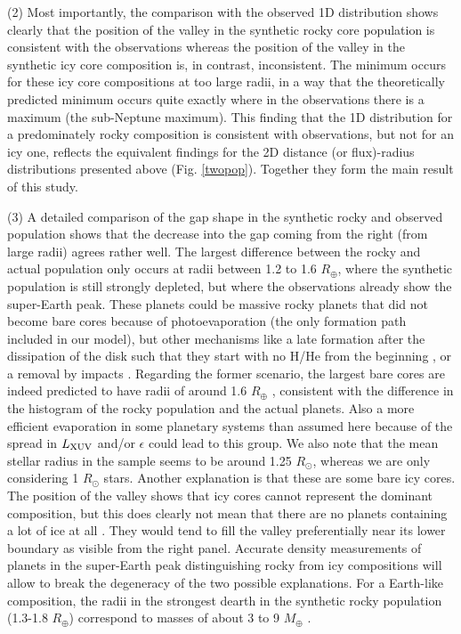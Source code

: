 \documentclass[]{emulateapj}
\def\mearth{M_{\oplus}}
\def\rearth{R_{\oplus}}
\begin{document}
(2)  Most importantly, the comparison with the observed 1D distribution shows clearly that the position of the valley  in the synthetic rocky core population is consistent with the \citet{Fulton2017} observations whereas the position of the valley in the synthetic icy core composition is, in contrast, inconsistent. The minimum occurs for these icy core compositions at too large radii, in a way that the theoretically predicted minimum occurs quite exactly where in the observations there is a maximum (the sub-Neptune maximum).  This finding that the 1D distribution for a predominately rocky composition is consistent with observations, but not for an icy  one, reflects the equivalent findings for the 2D distance (or flux)-radius distributions presented above (Fig. \ref{twopop}). Together they form the main result of this study.

(3) A detailed comparison of the gap shape in the synthetic rocky and observed population shows that the decrease into the gap coming from the right (from large radii) agrees rather well.  The largest difference between the rocky and actual population only occurs at radii between 1.2 to 1.6 $\rearth$, where the synthetic population is still strongly depleted, but where the observations already show the super-Earth peak. These planets could be massive rocky planets that did not become bare cores because of photoevaporation (the only formation path included in our model), but other mechanisms like a late formation after the dissipation of the disk such that they start with no H/He from the beginning \citep{Lee2014,LopezRice2016}, or a removal by impacts \citep[e.g.,][]{Schlichting2015}. Regarding the former scenario, the largest bare cores are indeed predicted to have radii of around 1.6 $\rearth$ \citep{LopezRice2016,Fulton2017}, consistent with the difference in the histogram of the rocky population and the actual planets. Also a more  efficient evaporation in some planetary systems than assumed here because of the spread in $L_{\rm XUV}$ and/or $\epsilon$ could lead to this group. We also note that the mean stellar radius in the \citet{Fulton2017} sample seems to be around 1.25 $R_\odot$, whereas we are only considering 1 $R_\odot$ stars. Another explanation is that these are  some bare icy cores. The position of the valley shows that icy cores cannot represent the dominant composition, but this does clearly not mean that there are no planets containing a lot of ice at all \citep[see also][]{Lopez2016}. They would tend to fill the valley preferentially near its lower boundary as visible from the right panel. Accurate density measurements of planets in the super-Earth peak distinguishing rocky from icy compositions will allow to break the degeneracy of the two possible explanations. For a Earth-like composition, the radii in the strongest dearth in the synthetic rocky population (1.3-1.8 $\rearth$) correspond to masses of about 3 to 9 $\mearth$ \citep[e.g.,][]{Mordasini2012b}. 
\end{document}
